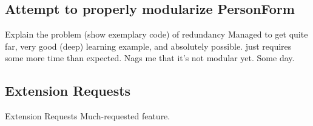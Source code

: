 % 

% 


\subsection{Attempt to properly modularize PersonForm}

\begin{frame}[c]
    Explain the problem (show exemplary code) of redundancy
    Managed to get quite far, very good (deep) learning example, and absolutely
    possible. just requires some more time than expected.
    Nags me that it's not modular yet. Some day.
\end{frame}


\subsection{Extension Requests}

\begin{frame}[c]{Extension Requests}
    Much-requested feature.
\end{frame}




% 


